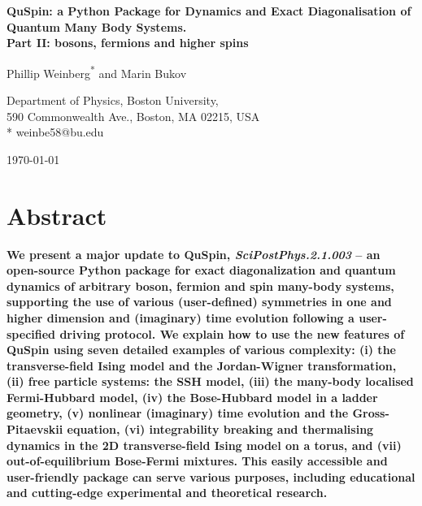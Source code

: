 \documentclass{SciPost}
\newcommand\0{\scalebox{-1}[1]{0}}
\begin{document}
\begin{center}{\Large \textbf{
QuSpin: a Python Package for Dynamics and Exact Diagonalisation of Quantum Many Body Systems.\\
\large Part II: bosons, fermions and higher spins
}}\end{center}

\begin{center}
Phillip Weinberg\textsuperscript{*} and Marin Bukov
\end{center}

\begin{center}
Department of Physics, Boston University, \\
590 Commonwealth Ave., Boston, MA 02215, USA
\\
* weinbe58@bu.edu
\end{center}

\begin{center}
\today
\end{center}


\section*{Abstract}
{\bf 
We present a major update to QuSpin, \emph{SciPostPhys.2.1.003} -- an open-source Python package for exact diagonalization and quantum dynamics of arbitrary boson, fermion and spin many-body systems, supporting the use of various (user-defined) symmetries in one and higher dimension and (imaginary) time evolution following a user-specified driving protocol. We explain how to use the new features of QuSpin using seven detailed examples of various complexity: (i) the transverse-field Ising model and the Jordan-Wigner transformation, (ii) free particle systems: the SSH model, (iii) the many-body localised Fermi-Hubbard model, (iv) the Bose-Hubbard model in a ladder geometry, (v) nonlinear (imaginary) time evolution and the Gross-Pitaevskii equation, (vi) integrability breaking and thermalising dynamics in the 2D transverse-field Ising model on a torus, and (vii) out-of-equilibrium Bose-Fermi mixtures. This easily accessible and user-friendly package can serve various purposes, including educational and cutting-edge experimental and theoretical research.
}
\end{document}
